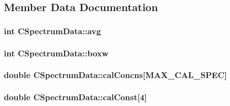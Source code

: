 \label{classCSpectrumData_a1050a3cf6a46b84cdbdca44b98c970fc}


\subsection{Member Data Documentation}
\hypertarget{classCSpectrumData_af150a81336f7f2b38f273b9afbaed5c3}{
\subsubsection[{avg}]{\setlength{\rightskip}{0pt plus 5cm}int {\bf CSpectrumData::avg}}}
\label{classCSpectrumData_af150a81336f7f2b38f273b9afbaed5c3}
\hypertarget{classCSpectrumData_a77d71cf442dabd538a5d8cbdc0c8ab5e}{
\subsubsection[{boxw}]{\setlength{\rightskip}{0pt plus 5cm}int {\bf CSpectrumData::boxw}}}
\label{classCSpectrumData_a77d71cf442dabd538a5d8cbdc0c8ab5e}
\hypertarget{classCSpectrumData_aa8be4bb61eba1061b182284528d39ab0}{
\subsubsection[{calConcns}]{\setlength{\rightskip}{0pt plus 5cm}double {\bf CSpectrumData::calConcns}\mbox{[}MAX\_\-CAL\_\-SPEC\mbox{]}}}
\label{classCSpectrumData_aa8be4bb61eba1061b182284528d39ab0}
\hypertarget{classCSpectrumData_aeb037dca76271fed78e56d2a770839ec}{
\subsubsection[{calConst}]{\setlength{\rightskip}{0pt plus 5cm}double {\bf CSpectrumData::calConst}\mbox{[}4\mbox{]}}}
\label{classCSpectrumData_aeb037dca76271fed78e56d2a770839ec}


